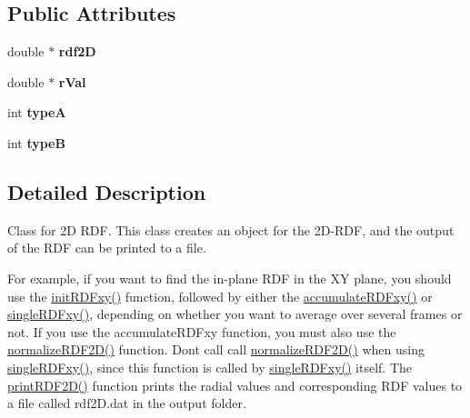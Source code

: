 \subsection*{Public Attributes}
\begin{DoxyCompactItemize}
\item 
\mbox{\label{classRdf2D_ad756caf75c389a69754105c70fb5db60}} 
double $\ast$ {\bfseries rdf2D}
\item 
\mbox{\label{classRdf2D_a3f7fdb2bb7ba36ff77f721c4abc8120a}} 
double $\ast$ {\bfseries r\+Val}
\item 
\mbox{\label{classRdf2D_a5720844aa069901d9e3b91a943af4ed8}} 
int {\bfseries typeA}
\item 
\mbox{\label{classRdf2D_ac4301eef0e368e8b67b6d03a152e0e8b}} 
int {\bfseries typeB}
\end{DoxyCompactItemize}


\subsection{Detailed Description}
Class for 2D R\+DF. This class creates an object for the 2\+D-\/\+R\+DF, and the output of the R\+DF can be printed to a file. 

For example, if you want to find the in-\/plane R\+DF in the XY plane, you should use the \mbox{\hyperlink{classRdf2D_a767f006de6412394a59f1cae5f7f6b35}{init\+R\+D\+Fxy()}} function, followed by either the \mbox{\hyperlink{classRdf2D_a6c716851d80fd2a7dcfefd219892d87b}{accumulate\+R\+D\+Fxy()}} or \mbox{\hyperlink{classRdf2D_afc5ff73aa9c126184e94ee3abfc14ff4}{single\+R\+D\+Fxy()}}, depending on whether you want to average over several frames or not. If you use the accumulate\+R\+D\+Fxy function, you must also use the \mbox{\hyperlink{classRdf2D_aaf6d00ec728e8c694ed2932332691c0d}{normalize\+R\+D\+F2\+D()}} function. Don\textquotesingle{}t call call \mbox{\hyperlink{classRdf2D_aaf6d00ec728e8c694ed2932332691c0d}{normalize\+R\+D\+F2\+D()}} when using \mbox{\hyperlink{classRdf2D_afc5ff73aa9c126184e94ee3abfc14ff4}{single\+R\+D\+Fxy()}}, since this function is called by \mbox{\hyperlink{classRdf2D_afc5ff73aa9c126184e94ee3abfc14ff4}{single\+R\+D\+Fxy()}} itself. The \mbox{\hyperlink{classRdf2D_aae00c1526117f6ac63d2c13354b6c404}{print\+R\+D\+F2\+D()}} function prints the radial values and corresponding R\+DF values to a file called rdf2\+D.\+dat in the output folder.

